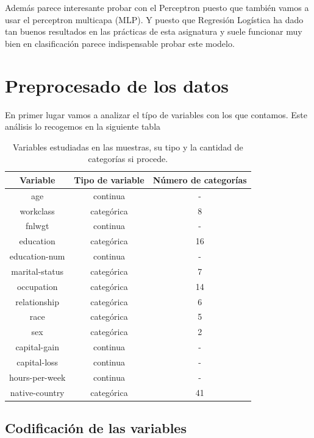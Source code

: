 \documentclass[a4paper,11pt]{article}
\begin{document}
Además parece interesante probar con el Perceptron puesto que también vamos a
usar el perceptron multicapa (MLP). Y puesto que Regresión Logística ha dado tan
buenos resultados en las prácticas de esta asignatura y suele funcionar muy bien
en clasificación parece indispensable probar este modelo.


\section{Preprocesado de los datos}

En primer lugar vamos a analizar el típo de variables con los que contamos. Este
análisis lo recogemos en la siguiente tabla

\begin{table}[h!]
    \centering
    \begin{tabular}{|c|c|c|}
    \hline
    Variable & Tipo de variable & Número de categorías\\ \hline
    age & continua & - \\ \hline
    workclass & categórica & 8 \\ \hline
    fnlwgt & continua & - \\ \hline
    education & categórica & 16 \\ \hline
    education-num & continua & - \\ \hline
    marital-status & categórica & 7 \\ \hline
    occupation & categórica & 14 \\ \hline
    relationship & categórica & 6 \\ \hline
    race & categórica & 5 \\ \hline
    sex & categórica & 2 \\ \hline
    capital-gain & continua & - \\ \hline
    capital-loss & continua & - \\ \hline
    hours-per-week & continua & - \\ \hline
    native-country & categórica & 41 \\ \hline
\end{tabular}
\caption{Variables estudiadas en las muestras, su tipo y la cantidad de categorías si procede.}
\end{table}

\subsection{Codificación de las variables}
\end{document}
